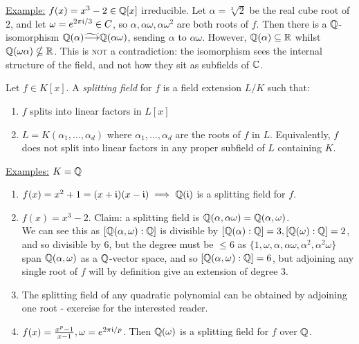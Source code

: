 \documentclass[10pt,a4paper]{article}
\begin{document}
\underline{Example:} $f(x) = x^3-2 \in \mathbb{Q}[x]$ irreducible. Let $\alpha=\sqrt[3]{2}$ be the real cube root of $2$, and let $\omega = e^{2\pi\mathfrak{i}/3} \in C$, so $\alpha, \alpha\omega, \alpha\omega^2$ are both roots of $f$. Then there is a $\mathbb{Q}$-isomorphism $\mathbb{Q}(\alpha)\widetilde{\longrightarrow} \mathbb{Q}(\alpha\omega)$, sending $\alpha$ to $\alpha\omega$. However, $\mathbb{Q}(\alpha)\subseteq \mathbb{R}$ whilst $\mathbb{Q}(\omega\alpha) \nsubseteq \mathbb{R}$. This is \textsc{not} a contradiction: the isomorphism sees the internal structure of the field, and not how they sit as subfields of $\mathbb{C}$.

Let $f\in K[x]$. A \emph{splitting field} for $f$ is a field extension $L/K$ such that:
\begin{enumerate}
\item $f$ splits into linear factors in $L[x]$
\item $L=K(\alpha_1, \ldots, \alpha_d)$ where $\alpha_1, \ldots, \alpha_d$ are the roots of $f$ in $L$. Equivalently, $f$ does not split into linear factors in any proper subfield of $L$ containing $K$.
\end{enumerate}

\underline{Examples:} $K = \mathbb{Q}$
\begin{enumerate}
\item $f(x) = x^2+1 = (x+\mathfrak{i})(x-\mathfrak{i}) \implies \mathbb{Q}(\mathfrak{i})$ is a splitting field for $f$.
\item $f(x) = x^3-2$. Claim: a splitting field is $\mathbb{Q}(\alpha, \alpha\omega) = \mathbb{Q}(\alpha,\omega)$.\\
We can see this as $[\mathbb{Q}(\alpha,\omega):\mathbb{Q}]$ is divisible by $[\mathbb{Q}(\alpha):\mathbb{Q}]=3, [\mathbb{Q}(\omega):\mathbb{Q}] = 2$, and so divisible by $6$, but the degree must be $\leq 6$ as $\{1, \omega, \alpha, \alpha\omega, \alpha^2, \alpha^2\omega\}$ span $\mathbb{Q}(\alpha,\omega)$ as a $\mathbb{Q}$-vector space, and so $[\mathbb{Q}(\alpha,\omega):\mathbb{Q}]=6$, but adjoining any single root of $f$ will by definition give an extension of degree $3$.
\item The splitting field of any quadratic polynomial can be obtained by adjoining one root - exercise for the interested reader.
\item $f(x) = \frac{x^p-1}{x-1}, \omega = e^{2\pi\mathfrak{i}/p}$. Then $\mathbb{Q}(\omega)$ is a splitting field for $f$ over $\mathbb{Q}$.
\end{enumerate}
\end{document}
